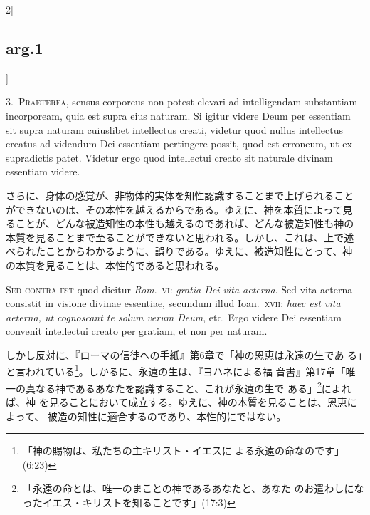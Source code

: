 \documentclass[paper=a4paper,fontsize=10pt,jafontsize=9pt,titlepage]{jlreq}
\begin{document}
\begin{paracol}{2}[\subsection{arg.1}]

3.~{\scshape Praeterea}, sensus corporeus non potest elevari ad
intelligendam substantiam incorpoream, quia est supra eius naturam. Si
igitur videre Deum per essentiam sit supra naturam cuiuslibet
intellectus creati, videtur quod nullus intellectus creatus ad
videndum Dei essentiam pertingere possit, quod est erroneum, ut ex
supradictis patet. Videtur ergo quod intellectui creato sit naturale
divinam essentiam videre.

\switchcolumn

さらに、身体の感覚が、非物体的実体を知性認識することまで上げられること
ができないのは、その本性を越えるからである。ゆえに、神を本質によって見
ることが、どんな被造知性の本性も越えるのであれば、どんな被造知性も神の
本質を見ることまで至ることができないと思われる。しかし、これは、上で述
べられたことからわかるように、誤りである。ゆえに、被造知性にとって、神
の本質を見ることは、本性的であると思われる。

\switchcolumn*[\subsection{s.c.}]

{\scshape Sed contra est} quod dicitur {\itshape Rom}.\ {\scshape vi}: {\itshape gratia
Dei vita aeterna}. Sed vita aeterna consistit in visione divinae
essentiae, secundum illud Ioan.\ {\scshape xvii}: {\itshape haec est vita
aeterna, ut cognoscant te solum verum Deum}, etc. Ergo videre Dei
essentiam convenit intellectui creato per gratiam, et non per naturam.

\switchcolumn

しかし反対に、『ローマの信徒への手紙』第6章で「神の恩恵は永遠の生であ
る」と言われている\footnote{「神の賜物は、私たちの主キリスト・イエスに
よる永遠の命なのです」(6:23)}。しかるに、永遠の生は、『ヨハネによる福
音書』第17章「唯一の真なる神であるあなたを認識すること、これが永遠の生で
ある」\footnote{「永遠の命とは、唯一のまことの神であるあなたと、あなた
のお遣わしになったイエス・キリストを知ることです」(17:3)}によれば、神
を見ることにおいて成立する。ゆえに、神の本質を見ることは、恩恵によって、
被造の知性に適合するのであり、本性的にではない。



\end{paracol}
\end{document}
